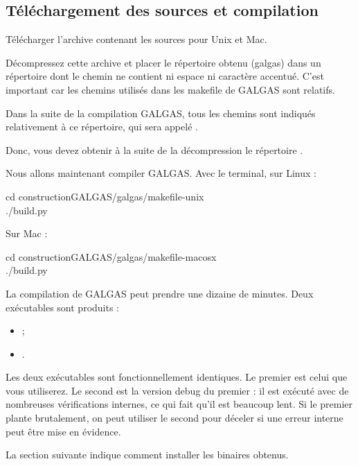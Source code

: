 \subsection{Téléchargement des sources et compilation}

Télécharger l’archive contenant les sources pour Unix et Mac.

Décompressez cette archive et placer le répertoire obtenu (galgas) dans un répertoire dont le chemin ne contient ni espace ni caractère accentué. C'est important car les chemins utilisés dans les makefile de GALGAS sont relatifs.

Dans la suite de la compilation GALGAS, tous les chemins sont indiqués relativement à ce répertoire, qui sera appelé .

Donc, vous devez obtenir à la suite de la décompression le répertoire .

Nous allons maintenant compiler GALGAS. Avec le terminal, sur Linux :
\begin{SHELL}
cd constructionGALGAS/galgas/makefile-unix\\
./build.py
\end{SHELL}

Sur Mac :
\begin{SHELL}
cd constructionGALGAS/galgas/makefile-macosx\\
./build.py
\end{SHELL}

La compilation de GALGAS peut prendre une dizaine de minutes. Deux exécutables sont produits :

\begin{itemize}
  \item {} ;
  \item {}.
\end{itemize}

Les deux exécutables sont fonctionnellement identiques. Le premier est celui que vous utiliserez. Le second est la version debug du premier : il est exécuté avec de nombreuses vérifications internes, ce qui fait qu’il est beaucoup lent. Si le premier plante brutalement, on peut utiliser le second pour déceler si une erreur interne peut être mise en évidence.

La section suivante indique comment installer les binaires obtenus.



